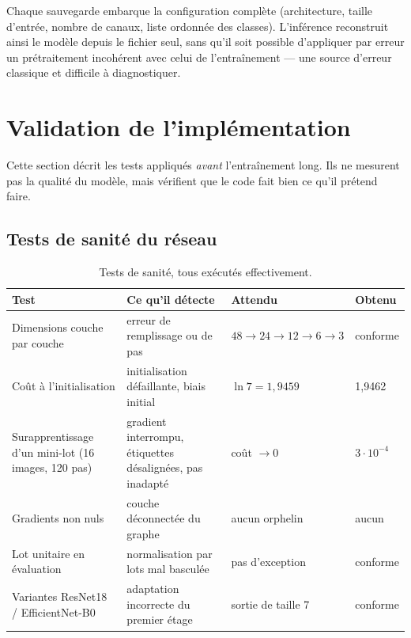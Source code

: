 \documentclass[11pt,a4paper]{article}
\begin{document}
Chaque sauvegarde embarque la configuration complète (architecture, taille
d'entrée, nombre de canaux, liste ordonnée des classes). L'inférence reconstruit
ainsi le modèle depuis le fichier seul, sans qu'il soit possible d'appliquer par
erreur un prétraitement incohérent avec celui de l'entraînement --- une source
d'erreur classique et difficile à diagnostiquer.

\section{Validation de l'implémentation}
\label{sec:validation}

Cette section décrit les tests appliqués \emph{avant} l'entraînement long. Ils
ne mesurent pas la qualité du modèle, mais vérifient que le code fait bien ce
qu'il prétend faire.

\subsection{Tests de sanité du réseau}

\begin{table}[h]
\centering
\small
\begin{tabularx}{\textwidth}{>{\raggedright\arraybackslash}p{4.3cm}Xll}
\toprule
\textbf{Test} & \textbf{Ce qu'il détecte} & \textbf{Attendu} & \textbf{Obtenu} \\
\midrule
Dimensions couche par couche &
  erreur de remplissage ou de pas &
  $48{\to}24{\to}12{\to}6{\to}3$ & \textcolor{accent}{conforme} \\
Coût à l'initialisation &
  initialisation défaillante, biais initial &
  $\ln 7 = 1{,}9459$ & \textcolor{accent}{1{,}9462} \\
Surapprentissage d'un mini-lot (16 images, 120 pas) &
  gradient interrompu, étiquettes désalignées, pas inadapté &
  coût $\to 0$ & \textcolor{accent}{$3\cdot10^{-4}$} \\
Gradients non nuls &
  couche déconnectée du graphe &
  aucun orphelin & \textcolor{accent}{aucun} \\
Lot unitaire en évaluation &
  normalisation par lots mal basculée &
  pas d'exception & \textcolor{accent}{conforme} \\
Variantes ResNet18 / EfficientNet-B0 &
  adaptation incorrecte du premier étage &
  sortie de taille 7 & \textcolor{accent}{conforme} \\
\bottomrule
\end{tabularx}
\caption{Tests de sanité, tous exécutés effectivement.}
\end{table}
\end{document}
